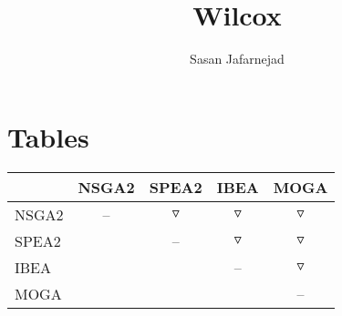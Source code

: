 \documentclass{article}
\title{Wilcox}
\author{Sasan Jafarnejad}
\begin{document}
 \maketitle
 \section{Tables}
 \begin{table}
 \centering \begin{tabular}{l c c c c }
  \hline & NSGA2 & SPEA2 & IBEA & MOGA \\
 \hline  NSGA2 &  --  & $\triangledown$ & $\triangledown$ & $\triangledown$ \\
  SPEA2 &   &  --  & $\triangledown$ & $\triangledown$ \\
  IBEA &   &   &  --  & $\triangledown$ \\
  MOGA &   &   &   &  --  \\
 \hline
 \end{tabular}
 \end{table}
 
\end{document}
